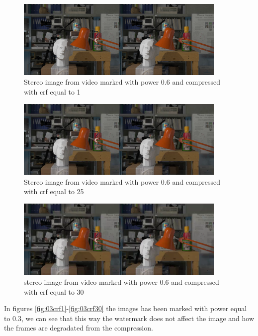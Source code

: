 \begin{figure}[h!]
\centering
\includegraphics[width=0.9\textwidth]{./img/06_crf1_gt.png}
\caption{\small{Stereo image from video marked with power 0.6 and compressed with crf equal to 1 }}
\label{fig:06crf1}
\end{figure}
\begin{figure}[h!]
\centering
\includegraphics[width=0.9\textwidth]{./img/06_crf25_gt.png}
\caption{\small{Stereo image from video marked with power 0.6 and compressed with crf equal to 25 }}
\label{fig:06crf25}
\end{figure}
\begin{figure}[h!]
\centering
\includegraphics[width=0.9\textwidth]{./img/06_crf30_gt.png}
\caption{\small{stereo image from video marked with power 0.6 and compressed with crf equal to 30 }}
\label{fig:06crf30}
\end{figure}

\clearpage

In figures \ref{fig:03crf1}-\ref{fig:03crf30} the images has been marked with power equal to 0.3, we can see that this way the watermark does not affect the image and how the frames are degradated from the compression.

